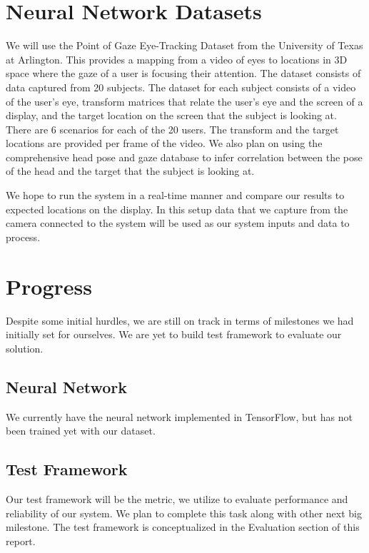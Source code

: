\documentclass[10pt,twocolumn,letterpaper]{article}
\begin{document}
\section{Neural Network Datasets}
We will use the Point of Gaze Eye-Tracking Dataset from the University
of Texas at Arlington\cite{eyetracking}. This provides a mapping from
a video of eyes to locations in 3D space where the gaze of a user is
focusing their attention. The dataset consists of data captured from
20 subjects. The dataset for each subject consists of a video of the
user’s eye, transform matrices that relate the user’s eye and the
screen of a display, and the target location on the screen that the
subject is looking at. There are 6 scenarios for each of the 20
users. The transform and the target locations are provided per frame
of the video. We also plan on using the comprehensive head pose and
gaze database\cite{mcmurrough} to infer correlation between the pose
of the head and the target that the subject is looking at.

We hope to run the system in a real-time manner and compare our
results to expected locations on the display. In this setup data that
we capture from the camera connected to the system will be used as our
system inputs and data to process.

\section{Progress}
Despite some initial hurdles, we are still on track in terms of milestones 
we had initially set for ourselves. We are yet to build test framework 
to evaluate our solution. 

\subsection{Neural Network}
We currently have the neural network implemented in TensorFlow, but
has not been trained yet with our dataset.

\subsection{Test Framework}
Our test framework will be the metric, we utilize to evaluate performance 
and reliability of our system. We plan to complete this task along 
with other next big milestone. The test framework is conceptualized 
in the Evaluation section of this report.
\end{document}
